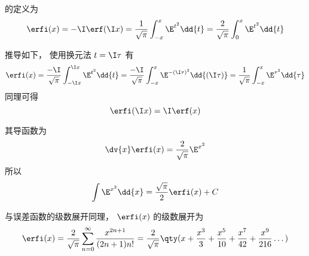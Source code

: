 

的定义为
\begin{equation}
\erfi(x) = -\I \erf(\I x) = \frac{1}{\sqrt{\pi}} \int_{-x}^x \E^{t^2} \dd{t}
= \frac{2}{\sqrt{\pi}} \int_0^x \E^{t^2} \dd{t}
\end{equation}

推导如下， 使用换元法 $t = \I \tau$ 有
\begin{equation}
\erfi(x) = \frac{-\I}{\sqrt{\pi}} \int_{-\I x}^{\I x} \E^{t^2} \dd{t}
= \frac{-\I}{\sqrt{\pi}} \int_{-x}^{x} \E^{-(\I \tau)^2} \dd{(\I \tau)}
= \frac{1}{\sqrt{\pi}} \int_{-x}^{x} \E^{\tau^2} \dd{\tau}
\end{equation}
同理可得
\begin{equation}
\erfi(\I x) = \I \erf(x)
\end{equation}

其导函数为
\begin{equation}
\dv{x} \erfi(x) = \frac{2}{\sqrt{\pi}} \E^{x^2}
\end{equation}
所以
\begin{equation}
\int \E^{x^2} \dd{x} = \frac{\sqrt{\pi}}{2} \erfi(x) + C
\end{equation}

与误差函数的级数展开同理， $\erfi(x)$ 的级数展开为
\begin{equation}
\erfi(x) = \frac{2}{\sqrt{\pi}} \sum_{n=0}^\infty \frac{x^{2n+1}}{(2n+1)n!}
= \frac{2}{\sqrt{\pi}}\qty(x + \frac{x^3}{3} + \frac{x^5}{10} + \frac{x^7}{42} + \frac{x^9}{216} \dots)
\end{equation}